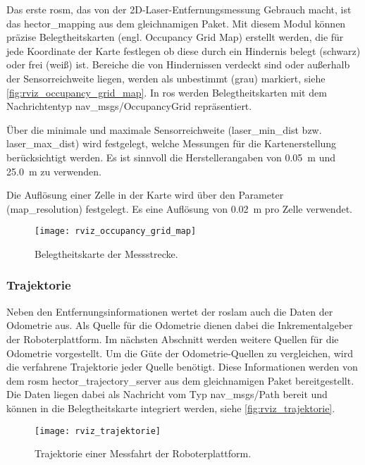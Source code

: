 Das erste \Gls{rosm}, das von der 2D-Laser-Entfernungsmessung Gebrauch macht, ist das hector\_mapping aus dem gleichnamigen Paket. Mit diesem Modul können präzise Belegtheitskarten (engl. Occupancy Grid Map) erstellt werden, die für jede Koordinate der Karte festlegen ob diese durch ein Hindernis belegt (schwarz) oder frei (weiß) ist. Bereiche die von Hindernissen verdeckt sind oder außerhalb der Sensorreichweite liegen, werden als unbestimmt (grau) markiert, siehe \autoref{fig:rviz_occupancy_grid_map}. In \Gls{ros} werden Belegtheitskarten mit dem Nachrichtentyp nav\_msgs/OccupancyGrid repräsentiert.

Über die minimale und maximale Sensorreichweite (laser\_min\_dist bzw. laser\_max\_dist) wird festgelegt, welche Messungen für die Kartenerstellung berücksichtigt werden. Es ist sinnvoll die Herstellerangaben von \SI{0.05}{\meter} und \SI{25.0}{\meter} zu verwenden.

Die Auflösung einer Zelle in der Karte wird über den Parameter (map\_resolution) festgelegt. Es eine Auflösung von \SI{0.02}{\meter} pro Zelle verwendet.

\begin{figure}
	\centering
	\texttt{[image: rviz\_occupancy\_grid\_map]}
	\caption{Belegtheitskarte der Messstrecke.}
	\label{fig:rviz_occupancy_grid_map}
\end{figure}
 

%
%
\subsubsection{Trajektorie}

Neben den Entfernungsinformationen wertet der \Gls{roslam} auch die Daten der Odometrie aus. Als Quelle für die Odometrie dienen dabei die Inkrementalgeber der Roboterplattform. Im nächsten Abschnitt werden weitere Quellen für die Odometrie vorgestellt. Um die Güte der Odometrie-Quellen zu vergleichen, wird die verfahrene Trajektorie jeder Quelle benötigt. Diese Informationen werden von dem \Gls{rosm} hector\_trajectory\_server aus dem gleichnamigen Paket bereitgestellt. Die Daten liegen dabei als Nachricht vom Typ nav\_msgs/Path bereit und können in die Belegtheitskarte integriert werden, siehe \autoref{fig:rviz_trajektorie}.

\begin{figure}
	\centering
	\texttt{[image: rviz\_trajektorie]}
	\caption{Trajektorie einer Messfahrt der Roboterplattform.}
	\label{fig:rviz_trajektorie}
\end{figure}


